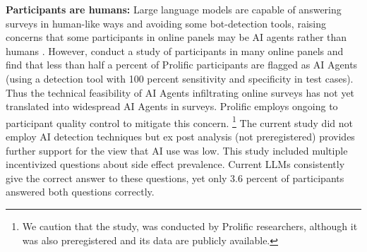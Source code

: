 \textbf{Participants are humans:} Large language models are capable of answering surveys in human-like ways and avoiding some bot-detection tools, raising concerns that some participants in online panels may be AI agents rather than humans \citep{westwood2025potential}. However, \citet{gordon2026ai} conduct a study of participants in many online panels and find that less than half a percent of Prolific participants are flagged as AI Agents (using a detection tool with 100 percent sensitivity and specificity in test cases). Thus the technical feasibility of AI Agents infiltrating online surveys has not yet translated into widespread AI Agents in surveys. Prolific employs ongoing to participant quality control to mitigate this concern.%
\footnote{We caution that the study, \citet{gordon2026ai} was conducted by Prolific researchers, although it was also preregistered and its data are publicly available.}  The current study did not employ AI detection techniques but ex post analysis (not preregistered) provides further support for the view that AI use was low. This study included multiple incentivized questions about side effect prevalence. Current LLMs consistently give the correct answer to these questions, yet only 3.6 percent of participants answered both questions correctly. 

